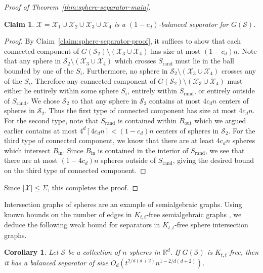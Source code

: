\documentclass[11pt, reqno]{amsart}
\theoremstyle{plain}
\newtheorem{corollary}[theorem]{Corollary}
\newtheorem{claim}[theorem]{Claim}
\theoremstyle{definition}
\theoremstyle{remark}
\numberwithin{theorem}{section}
\numberwithin{equation}{section}
\newcommand{\ceil}[1]{\left\lceil #1 \right\rceil}
\newcommand{\R}{\mathbb R}
\newcommand{\fS}{\mathcal S}
\newcommand{\fX}{\mathcal X}
\begin{document}
\begin{proof}[Proof of Theorem~\ref{thm:sphere-separator-main}]
\begin{claim}
$\fX=\fX_1\cup \fX_2\cup \fX_3\cup \fX_4$ is a $(1-c_d)$-balanced separator for $G(\fS)$. 
\end{claim}
\begin{proof}
By Claim~\ref{claim:sphere-separator-proof}, it suffices to show that each connected component of $G(\fS_2)\setminus(\fX_3\cup \fX_4)$ has size at most $(1-c_d)n$. Note that any sphere in $\fS_2\setminus(\fX_3\cup \fX_4)$ which crosses $S_{\mathrm{rand}}$ must lie in the ball bounded by one of the $S_i$. Furthermore, no sphere in $\fS_2\setminus(\fX_3\cup \fX_4)$ crosses any of the $S_i$. Therefore any connected component of $G(\fS_2)\setminus(\fX_3\cup \fX_4)$ must either lie entirely within some sphere $S_i$, entirely within $S_{\mathrm{rand}}$, or entirely outside of $S_{\mathrm{rand}}$. We chose $\fS_2$ so that any sphere in $\fS_2$ contains at most $4c_dn$ centers of spheres in $\fS_2$. Thus the first type of connected component has size at most $4c_dn$. For the second type, note that $S_{\mathrm{rand}}$ is contained within $B_{\mathrm{out}}$ which we argued earlier contains at most $4^{d}\ceil{4c_dn}<(1-c_d)n$ centers of spheres in $\fS_2$. For the third type of connected component, we know that there are at least $4c_dn$ spheres which intersect $B_{\mathrm{in}}$. Since $B_{\mathrm{in}}$ is contained in the interior of $S_{\mathrm{rand}}$, we see that there are at most $(1-4c_d)n$ spheres outside of $S_{\mathrm{rand}}$, giving the desired bound on the third type of connected component.
\end{proof}
Since $|\fX|\leq\Sigma$, this completes the proof.
\end{proof}

Intersection graphs of spheres are an example of semialgebraic graphs. Using known bounds on the number of edges in $K_{t,t}$-free semialgebraic graphs \cite{TY24}, we deduce the following weak bound for separators in $K_{t,t}$-free sphere intersection graphs. 

\begin{corollary}
\label{cor:ktt-free-separator-weak}
Let $\fS$ be a collection of $n$ spheres in $\R^d$. If $G(\fS)$ is $K_{t,t}$-free, then it has a balanced separator of size $O_d(t^{2/d(d+2)}n^{1-2/d(d+2)})$.
\end{corollary}
\end{document}
